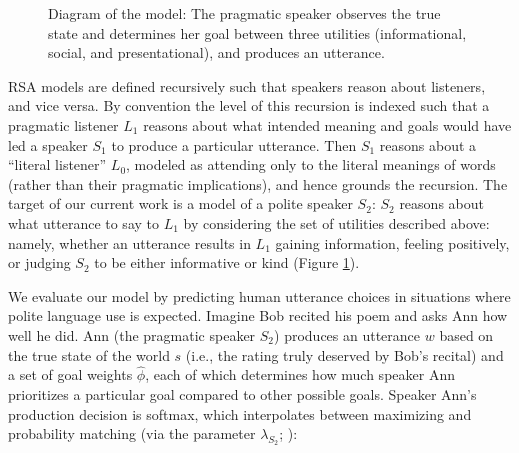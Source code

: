 \documentclass[12pt]{article}
\begin{document}
\begin{figure}
\centering
\caption{\label{fig:model}Diagram of the model: The pragmatic speaker observes the true state and determines her goal between three utilities (informational, social, and presentational), and produces an utterance.
}
\end{figure}


RSA models are defined recursively such that speakers reason about
listeners, and vice versa. By convention the level of this recursion is
indexed such that a pragmatic listener \(L_1\) reasons about what
intended meaning and goals would have led a speaker \(S_1\) to produce a
particular utterance. Then \(S_1\) reasons about a \enquote{literal
listener} \(L_0\), modeled as attending only to the literal meanings of
words (rather than their pragmatic implications), and hence grounds the
recursion. The target of our current work is a model of a polite speaker
\(S_2\): \(S_2\) reasons about what utterance to say to \(L_1\) by
considering the set of utilities described above: namely, whether an
utterance results in \(L_1\) gaining information, feeling positively, or
judging \(S_2\) to be either informative or kind (Figure
\ref{fig:model}).

We evaluate our model by predicting human utterance choices in
situations where polite language use is expected. Imagine Bob recited
his poem and asks Ann
how well he did. Ann (the pragmatic speaker \(S_2\)) produces an
utterance \(w\) based on the true state of the world \(s\) (i.e., the
rating truly deserved by Bob's recital) and a set of goal weights
\(\hat{\phi}\), each of which determines how much speaker Ann
prioritizes a particular goal compared to other possible goals. Speaker
Ann's production decision is softmax, which interpolates between maximizing
and probability matching (via the parameter \(\lambda_{S_2}\); \cite{goodman2013}):
\end{document}
